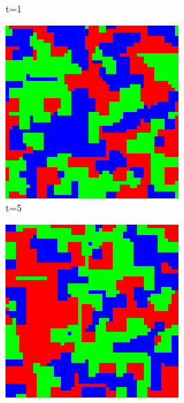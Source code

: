 \documentclass[a4paper, 11pt]{article}
\begin{document}
\begin{landscape}
\begin{figure}[H]
\begin{subfigure}{.20\textwidth}
  \caption{t=1}
\end{subfigure}%
\begin{subfigure}{.20\textwidth}
  \centering
  \includegraphics[width=0.95\linewidth]{ROCK_PAPER_SCISSORS_MOORE_50x50_t05}
  \caption{t=5}
\end{subfigure}%
\begin{subfigure}{.20\textwidth}
  \centering
  \includegraphics[width=0.95\linewidth]{ROCK_PAPER_SCISSORS_MOORE_50x50_t10}

\end{subfigure}
\end{figure}
\end{landscape}
\end{document}

